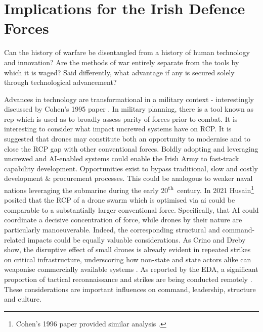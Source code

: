 \chapter{Implications for the Irish Defence Forces}

Can the history of warfare be disentangled from a history of human technology and innovation? Are the methods of war entirely separate from the tools by which it is waged? Said differently, what advantage if any is secured solely through technological advancement?

Advances in technology are transformational in a military context - interestingly discussed by Cohen's 1995 paper \nocite{COHEN_1995}. In military planning, there is a tool known as \gls{rcp} which is used as to broadly assess parity of forces prior to combat. It is interesting to consider what impact uncrewed systems have on RCP. It is suggested that drones may constitute both an opportunity to modernise and to close the RCP gap with other conventional forces. Boldly adopting and leveraging uncrewed and AI-enabled systems could enable the Irish Army to fast-track capability development. Opportunities exist to bypass traditional, slow and costly development \& procurement processes. This could be analogous to weaker naval nations leveraging the submarine during the early 20\textsuperscript{th}~century\parencite{COHEN_1996}.  In 2021 Husain\footnote{Cohen's 1996 paper provided similar analysis \nocite{COHEN_1996}.} \nocite{HUSAIN_2021}posited that the RCP of a drone swarm which is optimised via \gls{ai} could be comparable to a substantially larger conventional force. Specifically, that AI could coordinate a decisive concentration of force, while drones by their nature are particularly manoeuverable. Indeed, the corresponding structural and command-related impacts could be equally valuable considerations. As Crino and Dreby show, the disruptive effect of small drones is already evident in repeated strikes on critical infrastructure, underscoring how non-state and state actors alike can weaponise commercially available systems \parencite{CRINO_2020}. As reported by the EDA, a significant proportion of tactical reconnaissance and strikes are being conducted remotely \parencite{NICHOLESCU_2023}. These considerations are important influences on command, leadership, structure and culture.



